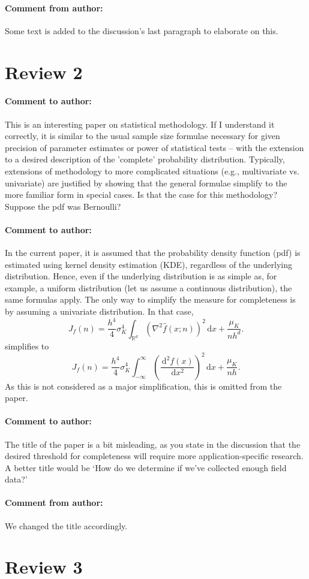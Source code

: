 \documentclass[10pt,final,a4paper,oneside,onecolumn]{article}
\newcommand{\measure}[2]{J_{#1} \left( #2 \right)}
\newcommand*{\ud}{\mathrm{\,d}}
\newcommand{\toauthor}{\paragraph*{Comment to author:}}
\newcommand{\fromauthor}{\paragraph*{Comment from author:}}
\begin{document}
\fromauthor Some text is added to the discussion's last paragraph to elaborate on this.

\section*{Review 2}

\toauthor This is an interesting paper on statistical methodology. If I understand it correctly, it is similar to the usual sample size formulae necessary for given precision of parameter estimates or power of statistical tests -- with the extension to a desired description of the 'complete' probability distribution. Typically, extensions of methodology to more complicated situations (e.g., multivariate vs. univariate) are justified by showing that the general formulae simplify to the more familiar form in special cases. Is that the case for this methodology? Suppose the pdf was Bernoulli? 

\toauthor In the current paper, it is assumed that the probability density function (pdf) is estimated using kernel density estimation (KDE), regardless of the underlying distribution. Hence, even if the underlying distribution is as simple as, for example, a uniform distribution (let us assume a continuous distribution), the same formulas apply. The only way to simplify the measure for completeness is by assuming a univariate distribution. In that case, 
\begin{equation}
	\measure{f}{n} = \frac{h^4}{4} \sigma_K^4 \int_{\mathbb{R}^d} \left( \nabla^2 \hat{f}(x;n) \right)^2 \ud x + \frac{\mu_K}{nh^d}.
\end{equation}
simplifies to
\begin{equation}
	\measure{f}{n} = \frac{h^4}{4} \sigma_K^4 \int_{-\infty}^{\infty} \left( \frac{\ud^2 f(x)}{\ud x^2} \right)^2 \ud x + \frac{\mu_K}{nh}.
\end{equation}
As this is not considered as a major simplification, this is omitted from the paper.

\toauthor The title of the paper is a bit misleading, as you state in the discussion that the desired threshold for completeness will require more application-specific research. A better title would be `How do we determine if we've collected enough field data?'

\fromauthor We changed the title accordingly.

\section*{Review 3}
\end{document}
